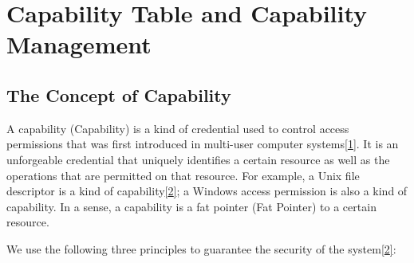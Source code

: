 \chapter{Capability Table and Capability Management}\label{ch:capability-table-management}

\section{The Concept of Capability}\label{sec:2-capability-concept}

A capability (Capability) is a kind of credential used to control access permissions that was first introduced in multi-user computer systems\hyperref[cite:2-1]{{[}1{]}}. It is an unforgeable credential that uniquely identifies a certain resource as well as the operations that are permitted on that resource. For example, a Unix file descriptor is a kind of capability\hyperref[cite:2-2]{{[}2{]}}; a Windows access permission is also a kind of capability. In a sense, a capability is a fat
pointer (Fat Pointer) to a certain resource.

We use the following three principles to guarantee the security of the system\hyperref[cite:2-2]{{[}2{]}}:

